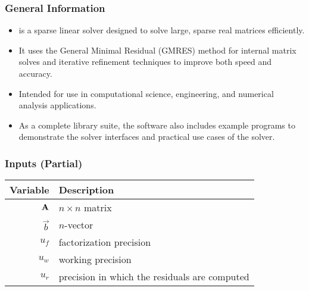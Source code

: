 \documentclass[t,12pt,numbers,fleqn]{beamer}
\begin{document}



\begin{frame}
\frametitle{General Information}

\begin{itemize}
\item \progname{} is a sparse linear solver designed to solve large, sparse real
  matrices efficiently.
\item It uses the General Minimal Residual (GMRES) method for internal matrix
  solves and iterative refinement techniques to improve both speed and accuracy.
\item Intended for use in computational science, engineering, and numerical
  analysis applications.
\item As a complete library suite, the software also includes example programs to
  demonstrate the solver interfaces and practical use cases of the solver.
\end{itemize}

\end{frame}


\begin{frame}
\frametitle{Inputs (Partial)}

\begin{table}[hp]
  \centering
  \label{tab:inputs}
  \begin{tabularx}{1.0\linewidth}{rX}
    \toprule
    \textbf{Variable}  & \textbf{Description} \\
    \midrule
    \(\mathbf{A}\) & \(n \times n\) matrix \\
    \(\vec{b}\)        & \(n\)-vector \\
    \(u_f\)       & factorization precision \\
    \(u_w\)       & working precision \\
    \(u_r\)       & precision in which the residuals are computed \\
    \bottomrule
  \end{tabularx}
\end{table}

\end{frame}

\end{document}

